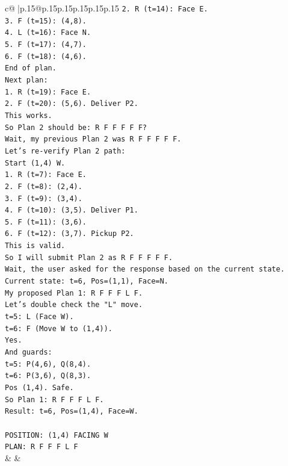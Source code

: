 \documentclass{article}
\begin{document}
{\begin{supertabular}{c@{$\;$}|p{.15\linewidth}@{}p{.15\linewidth}p{.15\linewidth}p{.15\linewidth}p{.15\linewidth}p{.15\linewidth}}
{{{\texttt{2. R (t=14): Face E.} \\
\texttt{3. F (t=15): (4,8).} \\
\texttt{4. L (t=16): Face N.} \\
\texttt{5. F (t=17): (4,7).} \\
\texttt{6. F (t=18): (4,6).} \\
\texttt{End of plan.} \\
\texttt{Next plan:} \\
\texttt{1. R (t=19): Face E.} \\
\texttt{2. F (t=20): (5,6). Deliver P2.} \\
\texttt{This works.} \\
\texttt{So Plan 2 should be: R F F F F F?} \\
\texttt{Wait, my previous Plan 2 was R F F F F F.} \\
\texttt{Let's re{-}verify Plan 2 path:} \\
\texttt{Start (1,4) W.} \\
\texttt{1. R (t=7): Face E.} \\
\texttt{2. F (t=8): (2,4).} \\
\texttt{3. F (t=9): (3,4).} \\
\texttt{4. F (t=10): (3,5). Deliver P1.} \\
\texttt{5. F (t=11): (3,6).} \\
\texttt{6. F (t=12): (3,7). Pickup P2.} \\
\texttt{This is valid.} \\
\texttt{So I will submit Plan 2 as R F F F F F.} \\
\texttt{Wait, the user asked for the response based on the current state.} \\
\texttt{Current state: t=6, Pos=(1,1), Face=N.} \\
\texttt{My proposed Plan 1: R F F F L F.} \\
\texttt{Let's double check the "L" move.} \\
\texttt{t=5: L (Face W).} \\
\texttt{t=6: F (Move W to (1,4)).} \\
\texttt{Yes.} \\
\texttt{And guards:} \\
\texttt{t=5: P(4,6), Q(8,4).} \\
\texttt{t=6: P(3,6), Q(8,3).} \\
\texttt{Pos (1,4). Safe.} \\
\texttt{So Plan 1: R F F F L F.} \\
\texttt{Result: t=6, Pos=(1,4), Face=W.} \\
\\ 
\texttt{POSITION: (1,4) FACING W} \\
\texttt{PLAN: R F F F L F} \\
            }
        }
    }
    & & \\ \\


\end{supertabular}}
\end{document}
